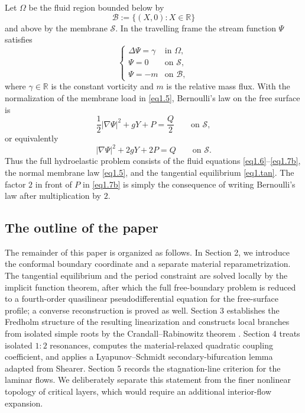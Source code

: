 \documentclass[12pt]{article}
\numberwithin{equation}{section}
\numberwithin{equation}{section}
\begin{document}
Let $\Omega$ be the fluid region bounded below by
\[
\mathcal B:=\{(X,0):X\in\mathbb R\}
\]
and above by the membrane $\mathcal S$.  In the travelling frame the stream function
$\Psi$ satisfies
\begin{equation}\label{eq1.6}
\left\{
\begin{array}{ll}
\Delta\Psi=\gamma & \text{in }\Omega,\\
\Psi=0 & \text{on }\mathcal S,\\
\Psi=-m & \text{on }\mathcal B,
\end{array}\right.
\end{equation}
where $\gamma\in\mathbb R$ is the constant vorticity and $m$ is the relative mass flux.
With the normalization of the membrane load in \eqref{eq1.5}, Bernoulli's law on the
free surface is
\begin{equation}\label{eq1.7}
\frac12|\nabla\Psi|^2+gY+P=\frac Q2
\qquad\text{on }\mathcal S,
\end{equation}
or equivalently
\begin{equation}\label{eq1.7b}
|\nabla\Psi|^2+2gY+2P=Q
\qquad\text{on }\mathcal S .
\end{equation}
Thus the full hydroelastic problem consists of the fluid equations
\eqref{eq1.6}--\eqref{eq1.7b}, the normal membrane law \eqref{eq1.5}, and the tangential
equilibrium \eqref{eq1.tan}.  The factor $2$ in front of $P$ in \eqref{eq1.7b} is simply the consequence of writing Bernoulli's law after multiplication by $2$.

\subsection{The outline of the paper}

The remainder of this paper is organized as follows. In Section 2, we introduce the conformal boundary coordinate and a separate material reparametrization.  The tangential equilibrium and the period constraint are solved locally by the implicit function theorem, after which the full free-boundary problem is reduced to a fourth-order quasilinear pseudodifferential equation for the free-surface profile; a converse reconstruction is proved as well. Section 3 establishes the Fredholm structure of the resulting linearization and constructs local branches from isolated simple roots by the Crandall--Rabinowitz theorem \cite{CrandallR}. Section 4 treats isolated $1{:}2$ resonances, computes the material-relaxed quadratic coupling coefficient, and applies a Lyapunov--Schmidt secondary-bifurcation lemma adapted from Shearer. Section 5 records the stagnation-line criterion for the laminar flows. We deliberately separate this statement from the finer nonlinear topology of critical layers, which would require an additional interior-flow expansion.
\end{document}
